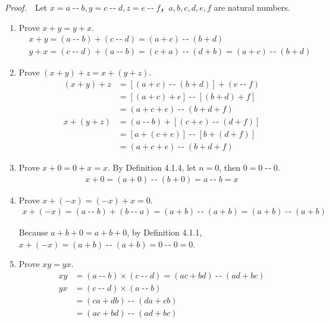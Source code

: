 \documentclass{book}
\DeclareMathOperator{\tminus}{-\!-}%
\newcommand{\pff}{\vspace{.25em}\noindent\emph{Proof.}~~}
\begin{document}
\pff Let $x=a\tminus b,y=c\tminus d,z=e\tminus f$，$a,b,c,d,e,f$ are natural numbers.
\begin{enumerate}
    \item Prove $x+y=y+x$.
        \begin{align*}
            &x+y=(a\tminus b)+(c\tminus d)=(a+c)\tminus(b+d)\\
            &y+x=(c\tminus d)+(a\tminus b)=(c+a)\tminus(d+b)=(a+c)\tminus(b+d)
        \end{align*}

    \item Prove $(x+y)+z=x+(y+z)$.
        \begin{align*}
            (x+y)+z&=[(a+c)\tminus(b+d)]+(e\tminus f)\\
                   &=[(a+c)+e]\tminus[(b+d)+f]\\
               &=(a+c+e)\tminus(b+d+f)\\
            x+(y+z)&=(a\tminus b)+[(c+e)\tminus(d+f)]\\
               &=[a+(c+e)]\tminus[b+(d+f)]\\
               &=(a+c+e)\tminus(b+d+f)
        \end{align*}

    \item Prove $x+0=0+x=x$. By Definition 4.1.4, let $n=0$, then $0=0\tminus0$.
            \begin{align*}
                x+0=(a+0)\tminus(b+0)=a\tminus b=x
            \end{align*}

    \item Prove $x+(-x)=(-x)+x=0$.
        \begin{align*}
            x+(-x)=(a\tminus b)+(b\tminus a)=(a+b)\tminus(a+b)=(a+b)\tminus(a+b)
        \end{align*}
    
    Because $a+b+0=a+b+0$, by Definition 4.1.1, $x+(-x)=(a+b)\tminus(a+b)=0\tminus0=0$.

    \item Prove $xy=yx$.
        \begin{align*}
            xy&=(a\tminus b)\times(c\tminus d)=(ac+bd)\tminus(ad+bc)\\
            yx&=(c\tminus d)\times(a\tminus b)\\
            &=(ca+db)\tminus(da+cb)\\
            &=(ac+bd)\tminus(ad+bc)
        \end{align*}


\end{enumerate}
\end{document}

